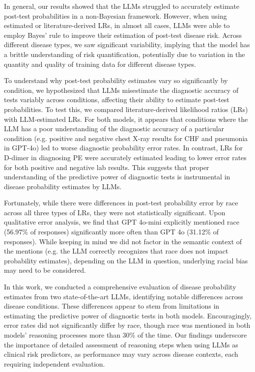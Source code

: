 In general, our results showed that the LLMs struggled to accurately estimate post-test probabilities in a non-Bayesian framework. However, when using estimated or literature-derived LRs, in almost all cases, LLMs were able to employ Bayes’ rule to improve their estimation of post-test disease risk. Across different disease types, we saw significant variability, implying that the model has a brittle understanding of risk quantification, potentially due to variation in the quantity and quality of training data for different disease types. 

To understand why post-test probability estimates vary so significantly by condition, we hypothesized that LLMs misestimate the diagnostic accuracy of tests variably across conditions, affecting their ability to estimate post-test probabilities. To test this, we compared literature-derived likelihood ratios (LRs) with LLM-estimated LRs. For both models, it appears that conditions where the LLM has a poor understanding of the diagnostic accuracy of a particular condition (e.g. positive and negative chest X-ray results for CHF and pneumonia in GPT-4o) led to worse diagnostic probability error rates. In contrast, LRs for D-dimer in diagnosing PE were accurately estimated leading to lower error rates for both positive and negative lab results. This suggests that proper understanding of the predictive power of diagnostic tests is instrumental in disease probability estimates by LLMs. 

Fortunately, while there were differences in post-test probability error by race across all three types of LRs, they were not statistically significant. Upon qualitative error analysis, we find that GPT 4o-mini explicitly mentioned race (56.97\% of responses) significantly more often than GPT 4o (31.12\% of responses). While keeping in mind we did not factor in the semantic context of the mentions (e.g. the LLM correctly recognizes that race does not impact probability estimates), depending on the LLM in question, underlying racial bias may need to be considered. 

In this work, we conducted a comprehensive evaluation of disease probability estimates from two state-of-the-art LLMs, identifying notable differences across disease conditions. These differences appear to stem from limitations in estimating the predictive power of diagnostic tests in both models. Encouragingly, error rates did not significantly differ by race, though race was mentioned in both models' reasoning processes more than 30\% of the time. Our findings underscore the importance of detailed assessment of reasoning steps when using LLMs as clinical risk predictors, as performance may vary across disease contexts, each requiring independent evaluation.


